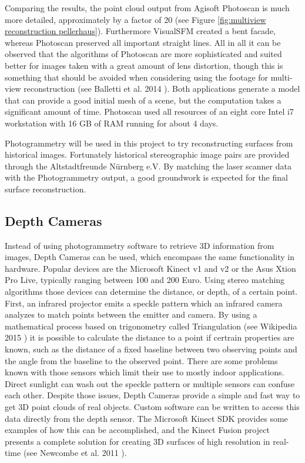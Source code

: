 Comparing the results, the point cloud output from Agisoft Photoscan is much more detailed, approximately by a factor of 20 (see Figure \ref{fig:multiview reconstruction pellerhaus}). Furthermore VisualSFM created a bent facade, whereas Photoscan preserved all important straight lines. All in all it can be observed that the algorithms of Photoscan are more sophisticated and suited better for images taken with a great amount of lens distortion, though this is something that should be avoided when considering using the footage for multi-view reconstruction (see Balletti et al. 2014 \parencite{calibration_of_action_cameras}). Both applications generate a model that can provide a good initial mesh of a scene, but the computation takes a significant amount of time. Photoscan used all resources of an eight core Intel i7 workstation with 16 GB of RAM running for about 4 days.

Photogrammetry will be used in this project to try reconstructing surfaces from historical images. Fortunately historical stereographic image pairs are provided through the Altstadtfreunde Nürnberg e.V. By matching the laser scanner data with the Photogrammetry output, a good groundwork is expected for the final surface reconstruction.

\subsection{Depth Cameras}

Instead of using photogrammetry software to retrieve 3D information from images, Depth Cameras can be used, which encompass the same functionality in hardware. Popular devices are the Microsoft Kinect v1 and v2 or the Asus Xtion Pro Live, typically ranging between 100 and 200 Euro. Using stereo matching algorithms those devices can determine the distance, or depth, of a certain point. First, an infrared projector emits a speckle pattern which an infrared camera analyzes to match points between the emitter and camera. By using a mathematical process based on trigonometry called Triangulation (see Wikipedia 2015 \parencite{wiki:Triangulation}) it is possible to calculate the distance to a point if certrain properties are known, such as the distance of a fixed baseline between two observing points and the angle from the baseline to the observed point. There are some problems known with those sensors which limit their use to mostly indoor applications. Direct sunlight can wash out the speckle pattern or multiple sensors can confuse each other. Despite those issues, Depth Cameras provide a simple and fast way to get 3D point clouds of real objects. Custom software can be written to access this data directly from the depth sensor. The Microsoft Kinect SDK provides some examples of how this can be accomplished, and the Kinect Fusion project presents a complete solution for creating 3D surfaces of high resolution in real-time (see Newcombe et al. 2011 \parencite{kinectfusion}).

